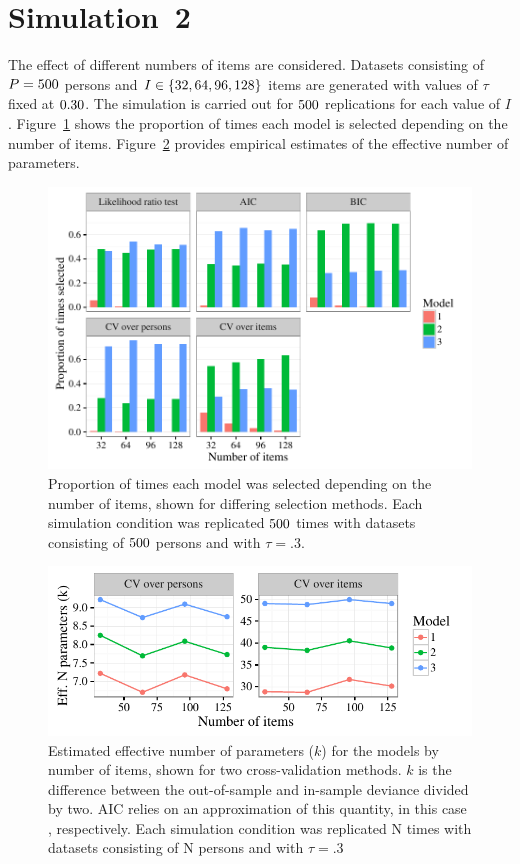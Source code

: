 \documentclass[12pt, letterpaper]{article}
\begin{document}
\section{Simulation~2}

The effect of different numbers of items are considered.
Datasets consisting of $P = 500$ persons and $I \in \{32, 64, 96, {} 128\}$ items are generated with values of $\tau$ fixed at $0.30$. The simulation is carried out for $500$ replications for each value of $I$.
Figure~\ref{fig:select-overnitems} shows the proportion of times each model is selected depending on the number of items. Figure~\ref{fig:k-overnitems} provides empirical estimates of the effective number of parameters.

\begin{figure}[tbp]
	\centering
	\includegraphics{chapter_2/figs/select_overnitems.pdf}
	\caption{Proportion of times each model was selected depending on the number of items, shown for differing selection methods. Each simulation condition was replicated $500$ times with datasets consisting of $500$ persons and with $\tau = .3$.}
	\label{fig:select-overnitems}
\end{figure}

\begin{figure}[tbp]
	\centering
	\includegraphics{chapter_2/figs/k_overnitems.pdf}
	\caption{Estimated effective number of parameters ($k$) for the models by number of items, shown for two cross-validation methods. $k$ is the difference between the out-of-sample and in-sample deviance divided by two. AIC relies on an approximation of this quantity, in this case \aic[and], respectively. Each simulation condition was replicated N times with datasets consisting of N persons and with $\tau = .3$}
	\label{fig:k-overnitems}
\end{figure}
\end{document}
